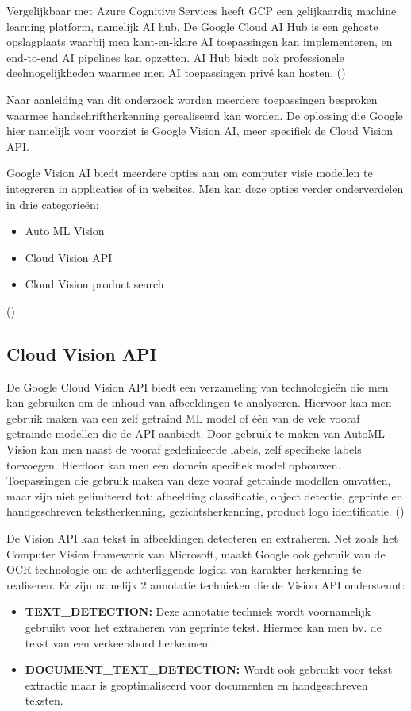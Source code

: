 Vergelijkbaar met Azure Cognitive Services heeft GCP een gelijkaardig machine learning platform, namelijk AI hub. De Google Cloud AI Hub is een gehoste opslagplaats waarbij men kant-en-klare AI toepassingen kan implementeren, en end-to-end AI pipelines kan opzetten. AI Hub biedt ook professionele deelmogelijkheden waarmee men AI toepassingen privé kan hosten. (\cite{Google2020b})



Naar aanleiding van dit onderzoek worden meerdere toepassingen besproken waarmee handschriftherkenning gerealiseerd kan worden. De oplossing die Google hier namelijk voor voorziet is Google Vision AI, meer specifiek de Cloud Vision API. 

Google Vision AI biedt meerdere opties aan om computer visie modellen te integreren in applicaties of in websites. Men kan deze opties verder onderverdelen in drie categorieën: 
\begin{itemize}
	\item Auto ML Vision
	\item Cloud Vision API
	\item Cloud Vision product search
\end{itemize}
(\cite{Google2020c})


\subsection{Cloud Vision API}
De Google Cloud Vision API biedt een verzameling van technologieën die men kan gebruiken om de inhoud van afbeeldingen te analyseren. Hiervoor kan men gebruik maken van een zelf getraind ML model of één van de vele vooraf getrainde modellen die de API aanbiedt. Door gebruik te maken van AutoML Vision kan men naast de vooraf gedefinieerde labels, zelf specifieke labels toevoegen. Hierdoor kan men een domein specifiek model opbouwen. Toepassingen die gebruik maken van deze vooraf getrainde modellen omvatten, maar zijn niet gelimiteerd tot: afbeelding classificatie, object detectie, geprinte en handgeschreven tekstherkenning, gezichtsherkenning, product logo identificatie. (\cite{Google2020d})


De Vision API kan tekst in afbeeldingen detecteren en extraheren. Net zoals het Computer Vision framework van Microsoft, maakt Google ook gebruik van de OCR technologie om de achterliggende logica van karakter herkenning te realiseren. Er zijn namelijk 2 annotatie technieken die de Vision API ondersteunt: 

\begin{itemize}
	\item \textbf{TEXT\_DETECTION:} Deze annotatie techniek wordt voornamelijk gebruikt voor het extraheren van geprinte tekst. Hiermee kan men bv. de tekst van een verkeersbord herkennen.  
	\item \textbf{DOCUMENT\_TEXT\_DETECTION:} Wordt ook gebruikt voor tekst extractie maar is geoptimaliseerd voor documenten en handgeschreven teksten. 
\end{itemize}


